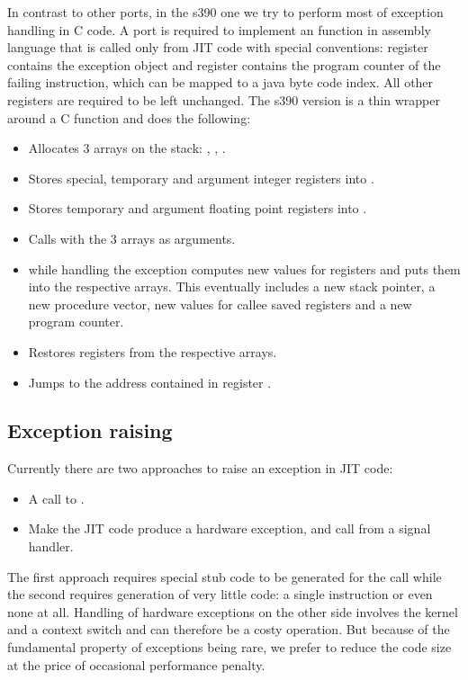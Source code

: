 In contrast to other ports, in the s390 one we try to perform most of exception handling in C code. A port is required to implement an  function in assembly language that is called only from JIT code with special conventions: register  contains the exception object and register  contains the program counter of the failing instruction, which can be mapped to a java byte code index. All other registers are required to be left unchanged. The s390 version is a thin wrapper around a C function  and does the following:

\begin{itemize}
	\item Allocates 3 arrays on the stack: , , .
	\item Stores special, temporary and argument integer registers into .
	\item Stores temporary and argument floating point registers into .
	\item Calls  with the 3 arrays as arguments.
	\item {} while handling the exception computes new values for registers and puts them into the respective arrays. This eventually includes a new stack pointer, a new procedure vector, new values for callee saved registers and a new program counter.
	\item Restores registers from the respective arrays.
	\item Jumps to the address contained in register .
\end{itemize}

\subsection{Exception raising}

Currently there are two approaches to raise an exception in JIT code:

\begin{itemize}
	\item A call to .
	\item Make the JIT code produce a hardware exception, and call  from a signal handler.
\end{itemize}

The first approach requires special stub code to be generated for the call while the second requires generation of very little code: a single instruction or even none at all. Handling of hardware exceptions on the other side involves the kernel and a context switch and can therefore be a costy operation. But because of the fundamental property of exceptions being rare, we prefer to reduce the code size at the price of occasional performance penalty. 

